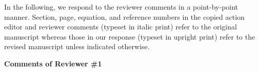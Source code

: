 \documentclass[11pt,onecolumn]{IEEEtran}
\begin{document}
In the following, we respond to the reviewer comments in a point-by-point manner. Section, page, equation, 
and reference numbers in the copied action editor and reviewer comments (typeset in italic print) refer to the 
original manuscript whereas those in our response (typeset in upright print) refer to the revised manuscript 
unless indicated otherwise.

\vspace{5mm}

 

\begin{center}
{\bf\large Comments of Reviewer \#1}
\vspace{1mm}
\end{center}
\end{document}

